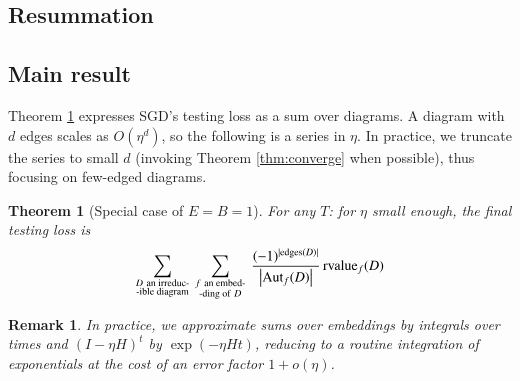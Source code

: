 \documentclass[final,12pt]{colt2021} %
\newtheorem{thm}{Theorem}
\newtheorem{rmk}{Remark}
\newcommand{\wabs}[1]{\left|#1\right|}
\newcommand{\Aut}{\text{\textnormal{Aut}}}
\newcommand{\rvalue}{\text{\textnormal{rvalue}}}
\newcommand{\edges}{\text{\textnormal{edges}}}
\begin{document}
        \subsection{Resummation}

        \subsection{Main result}
    
            Theorem \ref{thm:resum} expresses SGD's testing loss as a sum over
            diagrams.  A diagram with $d$ edges scales as $O(\eta^d)$, so the
            following is a series in $\eta$.  In practice, we truncate the
            series to small $d$ (invoking Theorem \ref{thm:converge} when
            possible), thus focusing on few-edged diagrams.
            \begin{thm}[Special case of $E=B=1$] \label{thm:resum}
                For any $T$: for $\eta$ small enough, the final testing loss is
                \begin{equation*} \label{eq:resum}
                    \sum_{\substack{D~\text{an irreduc-} \\ \text{-ible diagram}}}
                    ~
                    \sum_{\substack{f~\text{an embed-} \\ \text{-ding of}~D}}
                    ~
                    \frac{(-1)^{|\edges(D)|}}{\wabs{\Aut_f(D)}}
                    \,
                    {\rvalue_f}(D)
                \end{equation*}
            \end{thm}
    
     
            \begin{rmk} \label{rmk:integrate}
                In practice, we approximate sums over embeddings by integrals over
                times and $(I-\eta H)^t$ by $\exp(- \eta H t)$, reducing to a
                routine integration of exponentials at the cost of an error factor
                $1 + o(\eta)$.
            \end{rmk}
    
\end{document}
